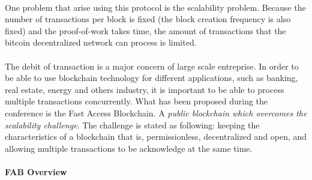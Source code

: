 \documentclass[11pt,a4paper]{article}
\begin{document}
\paragraph{}
One problem that arise using this protocol is the scalability problem.
Because the number of transactions per block is fixed
(the block creation frequency is also fixed)
and the
proof-of-work takes time, the amount of transactions
that the bitcoin decentralized network can process is limited.

\paragraph{}

The debit of transaction is a major concern of large scale
entreprise. In order to be able to use blockchain technology
for different applications, such as banking, real estate, energy
and others industry, it is important to be able
to process multiple transactions concurrently.
What has been proposed during the conference is the Fast Access Blockchain.
A \textit{public blockchain which overcomes the scalability challenge}.
The challenge is stated as following: keeping the characteristics
of a blockchain that is, permissionless, decentralized and open,
and allowing multiple transactions to be acknowledge at the same time.

\paragraph{FAB Overview}








\end{document}
